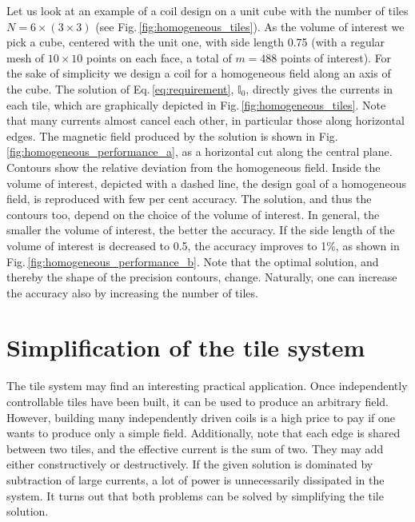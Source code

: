 Let us look at an example of a coil design on a unit cube with the number of tiles $N = 6 \times (3 \times 3)$ (see Fig.\,\ref{fig:homogeneous_tiles}). As the volume of interest we pick a cube, centered with the unit one, with side length 0.75 (with a regular mesh of $10 \times 10$ points on each face, a total of $m = 488$ points of interest). For the sake of simplicity we design a coil for a homogeneous field along an axis of the cube. The solution of Eq.\,\ref{eq:requirement}, $\mathbb{I}_0$, directly gives the currents in each tile, which are graphically depicted in Fig.\,\ref{fig:homogeneous_tiles}. Note that many currents almost cancel each other, in particular those along horizontal edges. The magnetic field produced by the solution is shown in Fig.\,\ref{fig:homogeneous_performance_a}, as a horizontal cut along the central plane. Contours show the relative deviation from the homogeneous field. Inside the volume of interest, depicted with a dashed line, the design goal of a homogeneous field, is reproduced with few per cent accuracy. The solution, and thus the contours too, depend on the choice of the volume of interest. In general, the smaller the volume of interest, the better the accuracy. If the side length of the volume of interest is decreased to 0.5, the accuracy improves to 1\%, as shown in Fig.\,\ref{fig:homogeneous_performance_b}. Note that the optimal solution, and thereby the shape of the precision contours, change. Naturally, one can increase the accuracy also by increasing the number of tiles.



\section{Simplification of the tile system}
The tile system may find an interesting practical application. Once independently controllable tiles have been built, it can be used to produce an arbitrary field. However, building many independently driven coils is a high price to pay if one wants to produce only a simple field. Additionally, note that each edge is shared between two tiles, and the effective current is the sum of two. They may add either constructively or destructively. If the given solution is dominated by subtraction of large currents, a lot of power is unnecessarily dissipated in the system. It turns out that both problems can be solved by simplifying the tile solution.

